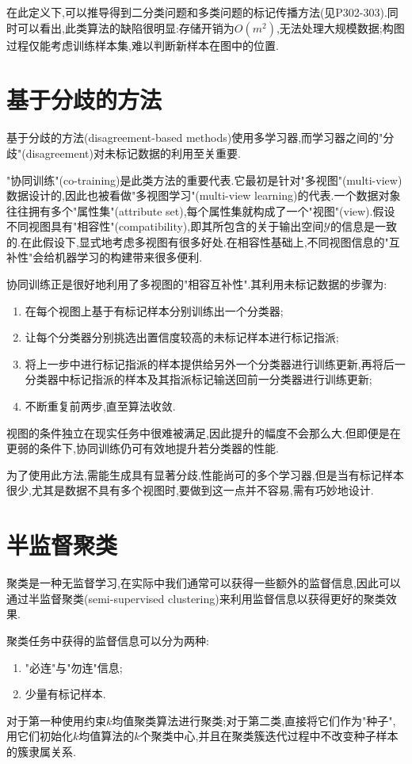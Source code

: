 在此定义下,可以推导得到二分类问题和多类问题的标记传播方法(见P302-303).同时可以看出,此类算法的缺陷很明显:存储开销为$O(m^2)$,无法处理大规模数据;构图过程仅能考虑训练样本集,难以判断新样本在图中的位置.

\section{基于分歧的方法}

基于分歧的方法(disagreement-based methods)使用多学习器,而学习器之间的"分歧"(disagreement)对未标记数据的利用至关重要.

"协同训练"(co-training)是此类方法的重要代表.它最初是针对"多视图"(multi-view)数据设计的,因此也被看做"多视图学习"(multi-view learning)的代表.一个数据对象往往拥有多个"属性集"(attribute set),每个属性集就构成了一个"视图"(view).假设不同视图具有"相容性"(compatibility),即其所包含的关于输出空间$\mathcal Y$的信息是一致的.在此假设下,显式地考虑多视图有很多好处.在相容性基础上,不同视图信息的"互补性"会给机器学习的构建带来很多便利.

协同训练正是很好地利用了多视图的"相容互补性".其利用未标记数据的步骤为:
\begin{enumerate}
\item 在每个视图上基于有标记样本分别训练出一个分类器;
\item 让每个分类器分别挑选出置信度较高的未标记样本进行标记指派;
\item 将上一步中进行标记指派的样本提供给另外一个分类器进行训练更新,再将后一分类器中标记指派的样本及其指派标记输送回前一分类器进行训练更新;
\item 不断重复前两步,直至算法收敛.
\end{enumerate}

视图的条件独立在现实任务中很难被满足,因此提升的幅度不会那么大.但即便是在更弱的条件下,协同训练仍可有效地提升若分类器的性能.

为了使用此方法,需能生成具有显著分歧,性能尚可的多个学习器,但是当有标记样本很少,尤其是数据不具有多个视图时,要做到这一点并不容易,需有巧妙地设计.

\section{半监督聚类}

聚类是一种无监督学习,在实际中我们通常可以获得一些额外的监督信息,因此可以通过半监督聚类(semi-supervised clustering)来利用监督信息以获得更好的聚类效果.

聚类任务中获得的监督信息可以分为两种:
\begin{enumerate}
\item "必连"与"勿连"信息;
\item 少量有标记样本.
\end{enumerate}

对于第一种使用约束$k$均值聚类算法进行聚类;对于第二类,直接将它们作为"种子",用它们初始化$k$均值算法的$k$个聚类中心,并且在聚类簇迭代过程中不改变种子样本的簇隶属关系.
